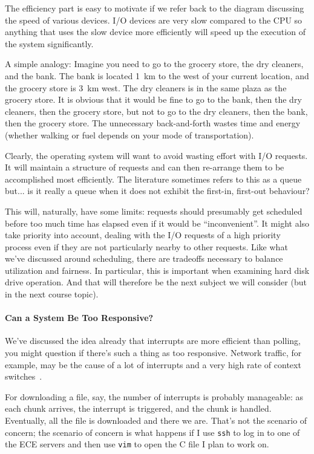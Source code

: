 The efficiency part is easy to motivate if we refer back to the diagram discussing the speed of various devices. I/O devices are very slow compared to the CPU so anything that uses the slow device more efficiently will speed up the execution of the system significantly.

A simple analogy: Imagine you need to go to the grocery store, the dry cleaners, and the bank. The bank is located 1~km to the west of your current location, and the grocery store is 3~km west. The dry cleaners is in the same plaza as the grocery store. It is obvious that it would be fine to go to the bank, then the dry cleaners, then the grocery store, but not to go to the dry cleaners, then the bank, then the grocery store. The unnecessary back-and-forth wastes time and energy (whether walking or fuel depends on your mode of transportation).

Clearly, the operating system will want to avoid wasting effort with I/O requests. It will maintain a structure of requests and can then re-arrange them to be accomplished most efficiently. The literature sometimes refers to this as a queue but... is it really a queue when it does not exhibit the first-in, first-out behaviour? 

This will, naturally, have some limits: requests should presumably get scheduled before too much time has elapsed even if it would be ``inconvenient''. It might also take priority into account, dealing with the I/O requests of a high priority process even if they are not particularly nearby to other requests. Like what we've discussed around scheduling, there are tradeoffs necessary to balance utilization and fairness. In particular, this is important when examining hard disk drive operation. And that will therefore be the next subject we will consider (but in the next course topic). 

\paragraph{Can a System Be Too Responsive?}
We've discussed the idea already that interrupts are more efficient than polling, you might question if there's such a thing as too responsive. Network traffic, for example, may be the cause of a lot of interrupts and a very high rate of context switches~\cite{osc}.

For downloading a file, say, the number of interrupts is probably manageable: as each chunk arrives, the interrupt is triggered, and the chunk is handled. Eventually, all the file is downloaded and there we are. That's not the scenario of concern; the scenario of concern is what happens if I use \texttt{ssh} to log in to one of the ECE servers and then use \texttt{vim} to open the C file I plan to work on.

